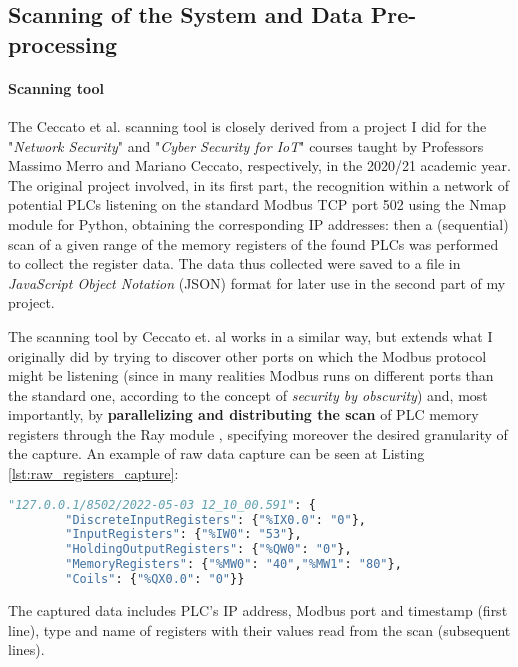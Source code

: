 \subsection{Scanning of the System and Data Pre-processing}
\label{subsec:ceccato_scan}
\paragraph{Scanning tool}
The Ceccato et al. scanning tool is closely derived from a project I did \cite{ns_proj} for the "\textit{Network Security}" and "\textit{Cyber Security for IoT}" courses taught by Professors Massimo Merro and Mariano Ceccato, respectively, in the 2020/21 academic year. The original project involved, in its first part, the recognition within a network of potential PLCs listening on the standard Modbus TCP port 502 using the Nmap module for Python, obtaining the corresponding IP addresses: then a (sequential) scan of a given range of the memory registers of the found PLCs was performed to collect the register data. The data thus collected were saved to a file in \textit{JavaScript Object Notation} (JSON) format for later use in the second part of my project.

\bigskip
The scanning tool by Ceccato et. al works in a similar way, but extends what I originally did by trying to discover other ports on which the Modbus protocol might be listening (since in many realities Modbus runs on different ports than the standard one, according to the concept of \textit{security by obscurity}) and, most importantly, by \textbf{parallelizing and distributing the scan} of PLC memory registers through the Ray module \cite{ray}, specifying moreover the desired granularity of the capture. An example of raw data capture can be seen at Listing \ref{lst:raw_registers_capture}:

\begin{lstlisting}[language=Python, numbers=none, caption=Example of registers capture, label=lst:raw_registers_capture]	
	"127.0.0.1/8502/2022-05-03 12_10_00.591": {
		"DiscreteInputRegisters": {"%IX0.0": "0"},
		"InputRegisters": {"%IW0": "53"},
		"HoldingOutputRegisters": {"%QW0": "0"},
		"MemoryRegisters": {"%MW0": "40","%MW1": "80"},
		"Coils": {"%QX0.0": "0"}}
\end{lstlisting}

The captured data includes PLC's IP address, Modbus port and timestamp (first line), type and name of registers with their values read from the scan (subsequent lines).

